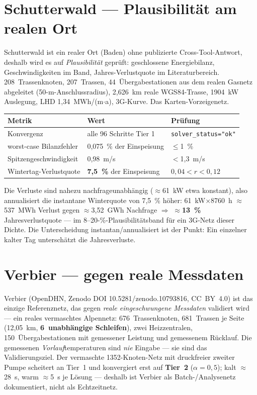 \documentclass[11pt,a4paper,parskip=half]{scrreprt}
\begin{document}
\section{Schutterwald --- Plausibilität am realen Ort}

Schutterwald ist ein realer Ort (Baden) ohne publizierte Cross-Tool-Antwort,
deshalb wird es auf \emph{Plausibilität} geprüft: geschlossene Energiebilanz,
Geschwindigkeiten im Band, Jahres-Verlustquote im Literaturbereich. 208~Trassenknoten,
207~Trassen, 44~Übergabestationen aus dem realen Gasnetz abgeleitet
(50-m-Anschlussradius), 2{,}626~km reale WGS84-Trasse, 1904~kW Auslegung, LHD
1{,}34~MWh/(m$\cdot$a), 3G-Kurve. Das Karten-Vorzeigenetz.

{\small
\begin{center}
\begin{tabular}{@{}lll@{}}
\toprule
Metrik & Wert & Prüfung \\
\midrule
Konvergenz            & alle 96 Schritte Tier 1 & \texttt{solver\_status="ok"} \\
worst-case Bilanzfehler & 0{,}075~\% der Einspeisung & $\leq$1~\% \\
Spitzengeschwindigkeit & 0{,}98~m/s & $<$1{,}3~m/s \\
Wintertag-Verlustquote & \textbf{7{,}5~\%} der Einspeisung & $0{,}04<r<0{,}12$ \\
\bottomrule
\end{tabular}
\end{center}}

Die Verluste sind nahezu nachfrageunabhängig ($\approx$61~kW etwa konstant), also
annualisiert die instantane Winterquote von 7{,}5~\% höher: 61~kW$\times$8760~h
$\approx$537~MWh Verlust gegen $\approx$3{,}52~GWh Nachfrage $\Rightarrow$
$\approx$\textbf{13~\%} Jahresverlustquote --- im 8--20-\%-Plausibilitätsband für
ein 3G-Netz dieser Dichte. Die Unterscheidung instantan/annualisiert ist der
Punkt: Ein einzelner kalter Tag unterschätzt die Jahresverluste.

\section{Verbier --- gegen reale Messdaten}

Verbier (OpenDHN, Zenodo DOI 10.5281/zenodo.10793816, CC~BY~4.0) ist das einzige
Referenznetz, das gegen \emph{reale eingeschwungene Messdaten} validiert wird ---
ein reales vermaschtes Alpennetz: 676~Trassenknoten, 681~Trassen je Seite
(12{,}05~km, \textbf{6~unabhängige Schleifen}), zwei Heizzentralen, 150~Übergabestationen
mit gemessener Leistung und gemessenem Rücklauf. Die gemessenen
\emph{Vorlauf}temperaturen sind \emph{nie} Eingabe --- sie sind das
Validierungsziel. Der vermaschte 1352-Knoten-Netz mit druckfreier zweiter Pumpe
scheitert an Tier~1 und konvergiert erst auf \textbf{Tier~2} ($\alpha=0{,}5$);
kalt $\approx$28~s, warm $\approx$5~s je Lösung --- deshalb ist Verbier als
Batch-/Analysenetz dokumentiert, nicht als Echtzeitnetz.
\end{document}
